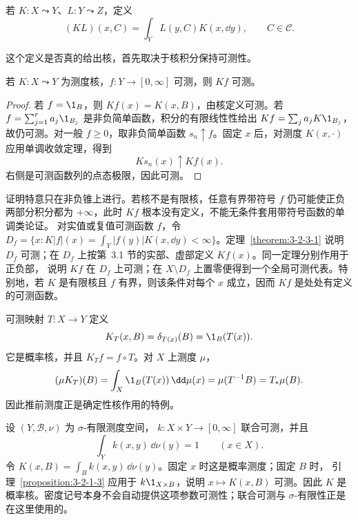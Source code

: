 \begin{definition}[核复合]\label{def:3-2-3-3}
若 $K:X\leadsto Y$、$L:Y\leadsto Z$，定义
\[
 (KL)(x,C)=\int_YL(y,C)K(x,\dd y),\qquad C\in\mathcal C.
\]
\end{definition}

这个定义是否真的给出核，首先取决于核积分保持可测性。

\begin{theorem}[核积分可测性]\label{theorem:3-2-3-1}
若 $K:X\leadsto Y$ 为测度核，$f:Y\to[0,\infty]$ 可测，则 $Kf$ 可测。
\end{theorem}

\begin{proof}
若 $f=\1_B$，则 $Kf(x)=K(x,B)$，由核定义可测。若
$f=\sum_{j=1}^ra_j\1_{B_j}$ 是非负简单函数，积分的有限线性性给出
$Kf=\sum_ja_jK\1_{B_j}$，故仍可测。对一般 $f\ge0$，取非负简单函数
$s_n\uparrow f$。固定 $x$ 后，对测度 $K(x,\cdot)$ 应用单调收敛定理，得到
\[
 Ks_n(x)\uparrow Kf(x).
\]
右侧是可测函数列的点态极限，因此可测。
\end{proof}

证明特意只在非负锥上进行。若核不是有限核，任意有界带符号 $f$ 仍可能使正负两部分积分都为
$+\infty$，此时 $Kf$ 根本没有定义，不能无条件套用带符号函数的单调类论证。
对实值或复值可测函数 $f$，令
$D_f=\{x:K|f|(x)=\int_Y|f(y)|K(x,\dd y)<\infty\}$。定理~\ref{theorem:3-2-3-1}
说明 $D_f$ 可测；在 $D_f$ 上按第~3.1 节的实部、虚部定义 $Kf(x)$。同一定理分别作用于正负部，
说明 $Kf$ 在 $D_f$ 上可测；在 $X\setminus D_f$ 上置零便得到一个全局可测代表。特别地，若
$K$ 是有限核且 $f$ 有界，则该条件对每个 $x$ 成立，因而 $Kf$ 是处处有定义的可测函数。

\begin{example}[确定性核]\label{ex:3-2-3-1}
可测映射 $T:X\to Y$ 定义
\[
 K_T(x,B)=\delta_{T(x)}(B)=\1_B(T(x)).
\]
它是概率核，并且
$K_Tf=f\circ T$。对 $X$ 上测度 $\mu$，
\[
 (\mu K_T)(B)=\int_X\1_B(T(x))\,\dd\mu(x)
 =\mu(T^{-1}B)=T_*\mu(B).
\]
因此推前测度正是确定性核作用的特例。
\end{example}

\begin{example}[密度核]\label{ex:3-2-3-2}
设 $(Y,\mathcal B,\nu)$ 为 $\sigma$-有限测度空间，
$k:X\times Y\to[0,\infty]$ 联合可测，并且
\[
 \int_Yk(x,y)\,\dd\nu(y)=1\qquad(x\in X).
\]
令
$K(x,B)=\int_Bk(x,y)\,\dd\nu(y)$。固定 $x$ 时这是概率测度；固定 $B$ 时，
引理~\ref{proposition:3-2-1-3} 应用于 $k\1_{X\times B}$，说明
$x\mapsto K(x,B)$ 可测。因此 $K$ 是概率核。密度记号本身不会自动提供这项参数可测性；联合可测与
$\sigma$-有限性正是在这里使用的。
\end{example}

